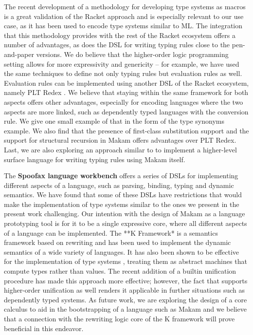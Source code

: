 The recent development of a methodology for developing type systems as
macros \citet{racket-type-systems-as-macros} is a great validation of
the Racket approach and is especially relevant to our use case, as it
has been used to encode type systems similar to ML. The integration that
this methodology provides with the rest of the Racket ecosystem offers a
number of advantages, as does the  DSL for writing
typing rules close to the pen-and-paper versions. We do believe that the
higher-order logic programming setting allows for more expressivity and
genericity -- for example, we have used the same techniques to define
not only typing rules but evaluation rules as well. Evaluation rules can
be implemented using another DSL of the Racket ecosystem, namely PLT
Redex \citep{felleisen2009semantics}. We believe that staying within the
same framework for both aspects offers other advantages, especially for
encoding languages where the two aspects are more linked, such as
dependently typed languages with the conversion rule. We give one small
example of that in the form of the type synonyms example. We also find
that the presence of first-class substitution support and the support
for structural recursion in Makam offers advantages over PLT Redex.
Last, we are also exploring an approach similar to 
to implement a higher-level surface language for writing typing rules
using Makam itself.

 The \textbf{Spoofax language workbench}
\citep{spoofax-main-reference} offers a series of DSLs for implementing
different aspects of a language, such as parsing, binding, typing and
dynamic semantics. We have found that some of these DSLs have
restrictions that would make the implementation of type systems similar
to the ones we present in the present work challenging. Our intention
with the design of Makam as a language prototyping tool is for it to be
a single expressive core, where all different aspects of a language can
be implemented. The **K Framework* \citep{k-framework-main-reference} is
a semantics framework based on rewriting and has been used to implement
the dynamic semantics of a wide variety of languages. It has also been
shown to be effective for the implementation of type systems
\citep{k-framework-type-systems}, treating them as abstract machines
that compute types rather than values. The recent addition of a builtin
unification procedure has made this approach more effective; however,
the fact that \lamprolog supports higher-order unification as well
renders it applicable in further situations such as dependently typed
systems. As future work, we are exploring the design of a core calculus
to aid in the bootstrapping of a language such as Makam and we believe
that a connection with the rewriting logic core of the K framework will
prove beneficial in this endeavor.
